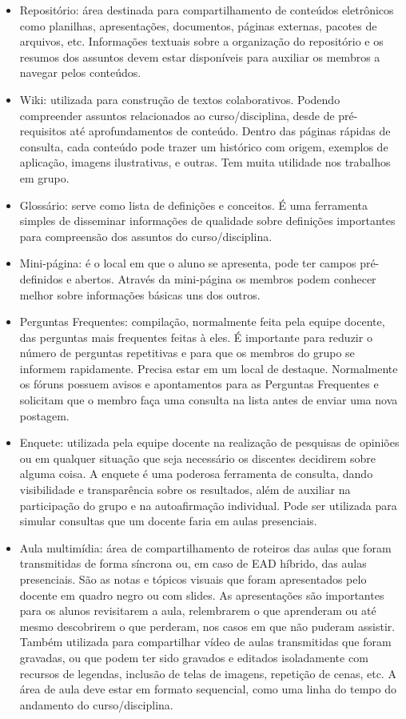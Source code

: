\begin{itemize}
\item Repositório: área destinada para compartilhamento de conteúdos eletrônicos como planilhas, apresentações, documentos, páginas externas, pacotes de arquivos, etc. Informações textuais sobre a organização do repositório e os resumos dos assuntos devem estar disponíveis para auxiliar os membros a navegar pelos conteúdos.
\item Wiki: utilizada para construção de textos colaborativos. Podendo compreender assuntos relacionados ao curso/disciplina, desde de pré-requisitos até aprofundamentos de conteúdo. Dentro das páginas rápidas de consulta, cada conteúdo pode trazer um histórico com origem, exemplos de aplicação, imagens ilustrativas, e outras. Tem muita utilidade nos trabalhos em grupo.
\item Glossário: serve como lista de definições e conceitos. É uma ferramenta simples de disseminar informações de qualidade sobre definições importantes para compreensão dos assuntos do curso/disciplina.
\item Mini-página: é o local em que o aluno se apresenta, pode ter campos pré-definidos e abertos. Através da mini-página os membros podem conhecer melhor sobre informações básicas uns dos outros.
\item Perguntas Frequentes: compilação, normalmente feita pela equipe docente, das perguntas mais frequentes feitas à eles. É importante para reduzir o número de perguntas repetitivas e para que os membros do grupo se informem rapidamente. Precisa estar em um local de destaque. Normalmente os fóruns possuem avisos e apontamentos para as Perguntas Frequentes e solicitam que o membro faça uma consulta na lista antes de enviar uma nova postagem.
\item Enquete: utilizada pela equipe docente na realização de pesquisas de opiniões ou em qualquer situação que seja necessário os discentes decidirem sobre alguma coisa. A enquete é uma poderosa ferramenta de consulta, dando visibilidade e transparência sobre os resultados, além de auxiliar na participação do grupo e na autoafirmação individual. Pode ser utilizada para simular consultas que um docente faria em aulas presenciais.
\item Aula multimídia: área de compartilhamento de roteiros das aulas que foram transmitidas de forma síncrona ou, em caso de EAD híbrido, das aulas presenciais. São as notas e tópicos visuais que foram apresentados pelo docente em quadro negro ou com slides. As apresentações são importantes para os alunos revisitarem a aula, relembrarem o que aprenderam ou até mesmo descobrirem o que perderam, nos casos em que não puderam assistir. Também utilizada para compartilhar vídeo de aulas transmitidas que foram gravadas, ou que podem ter sido gravados e editados isoladamente com recursos de legendas, inclusão de telas de imagens, repetição de cenas, etc. A área de aula deve estar em formato sequencial, como uma linha do tempo do andamento do curso/disciplina.

\end{itemize}
